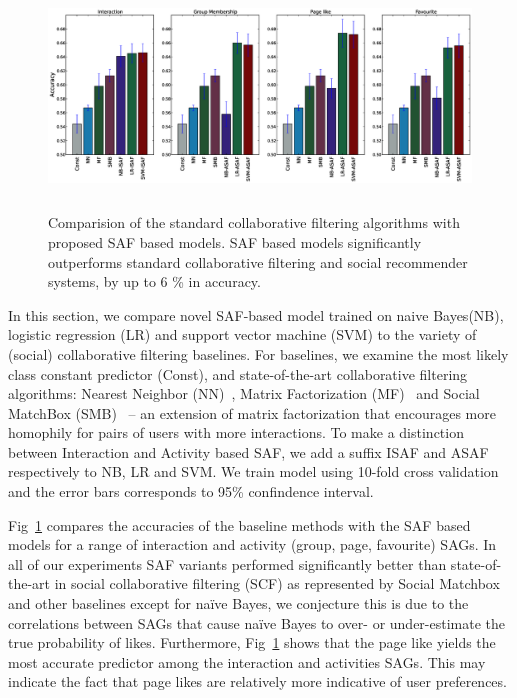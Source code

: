 \begin{figure}[tbp!]
\hspace{-6mm}\includegraphics[width=180mm,height=60mm]{data/plots/accuracy/accuracyLargeNew.eps}
\caption{  Comparision of the standard collaborative filtering algorithms with proposed SAF based models.  SAF based models significantly outperforms standard collaborative filtering and social recommender systems, by up to 6 \% in accuracy. }
\label{Fig1}
\end{figure}

In this section, we compare novel SAF-based model trained on naive Bayes(NB), 
logistic regression (LR) and support vector machine (SVM) to the variety of
(social) collaborative filtering baselines. For baselines, we examine the most 
likely class constant predictor (Const), and state-of-the-art collaborative 
filtering algorithms: Nearest Neighbor (NN)~\cite{bellkor}, Matrix Factorization (MF)~\cite{pmf} 
and Social MatchBox (SMB)~\cite{Noel2012NOF} -- an extension of matrix
factorization that encourages more homophily for pairs of users with
more interactions. To make a distinction between Interaction and Activity based SAF, 
we add a suffix ISAF and ASAF respectively to NB, LR and SVM. We train model using
10-fold cross validation and the error bars corresponds to 95\% confindence interval.

Fig~\ref{Fig1} compares the accuracies of the baseline methods 
with the SAF based models for a range of interaction and activity (group,
page, favourite) SAGs.  In all of our experiments SAF variants
performed significantly better than state-of-the-art in social
collaborative filtering (SCF) as represented by Social
Matchbox~\cite{Noel2012NOF} and other baselines except for na\"{i}ve Bayes, 
we conjecture this is due to the correlations between SAGs that cause na\"{i}ve
Bayes to over- or under-estimate the true probability of likes. Furthermore, Fig~\ref{Fig1} 
shows that the page like yields the most accurate predictor among the interaction and activities SAGs.
This may indicate the fact that page likes are relatively more indicative of user preferences.

